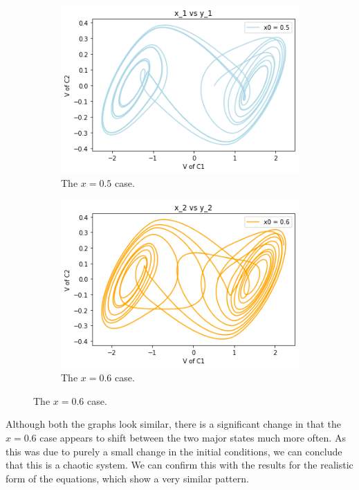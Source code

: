 \documentclass{article}
\begin{document}
    \begin{figure}[h!]
        \centering
        \begin{subfigure}[b]{0.4\textwidth}
            \centering
            \includegraphics[width=1.4\textwidth]{Images/separate1.png}
            \caption{The $x = 0.5$ case.}
            \label{fig:my_label}
        \end{subfigure}
        \hfill
        \begin{subfigure}[b]{0.4\textwidth}
            \centering
            \includegraphics[width=1.4\textwidth]{Images/separate2.png}
            \caption{The $x = 0.6$ case.}
            \label{fig:my_label}
        \end{subfigure}
    \end{figure}
    
    Although both the graphs look similar, there is a significant change in that the $x=0.6$ case appears to shift between the two major states much more often. As this was due to purely a small change in the initial conditions, we can conclude that this is a chaotic system. We can confirm this with the results for the realistic form of the equations, which show a very similar pattern. 
    
\end{document}
